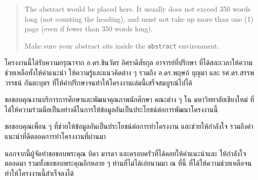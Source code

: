 \begin{abstract}
The abstract would be placed here. It usually does not exceed 350 words
long (not counting the heading), and must not take up more than one (1) page
(even if fewer than 350 words long).

Make sure your abstract sits inside the \texttt{abstract} environment.
\end{abstract}

\iffalse
\begin{dedication}
This document is dedicated to all Chiang Mai University students.

Dedication page is optional.
\end{dedication}
\fi %

\begin{acknowledgments}
โครงงานนี้ได้รับความกรุณาจาก อ.ดร.ชินวัตร อิศราดิสัยกุล อาจารย์ที่ปรึกษา ที่ได้สละเวลาให้ความช่วยเหลือทั้งให้คำแนะนำ ให้ความรู้และแนวคิดต่าง ๆ รวมถึง อ.ดร.พฤษภ์ บุญมา และ รศ.ดร.สรรพวรรธน์ กันตะบุตร ที่ให้คำปรึกษาจนทำให้โครงงานเล่มนี้เสร็จสมบูรณ์ไปได้
    
ขอขอบคุณงานบริการการศึกษาและพัฒนาคุณภาพนักศึกษา คณะต่าง ๆ ใน มหาวิทยาลัยเชียงใหม่ ที่ได้ให้ความร่วมมือเป็นอย่างดีในการให้ข้อมูลอันเป็นประโยชน์ต่อการพัฒนาโครงงานนี้

ขอขอบคุณเพื่อน ๆ ที่ช่วยให้ข้อมูลอันเป็นประโยชน์ต่อการทำโครงงาน และช่วยให้กำลังใจ รวมถึงคำแนะนำที่ดีตลอดการทำโครงงานที่ผ่านมา

นอกจากนี้ผู้จัดทำขอขอบพระคุณ บิดา มารดา และครอบครัวที่ได้คอยให้คำแนะนำและ ให้กำลังใจ ตลอดมา รวมทั้งขอขอบพระคุณอีกหลาย ๆ ท่านที่ไม่ได้เอ่ยนามมา ณ ที่นี้ ที่ได้ให้ความช่วยเหลือจนทำให้โครงงานนี้สำเร็จลงได้ 


\end{acknowledgments}%
\fi %

\contentspage

\ifproject
\figurelistpage

\tablelistpage
\fi %



